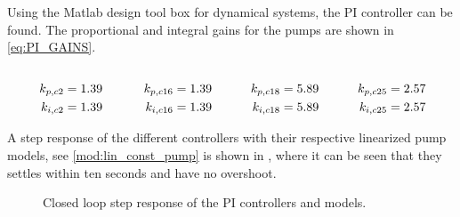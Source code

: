 Using the Matlab design tool box for dynamical systems, the PI controller can be found. The proportional and integral gains for the pumps are shown in \eqref{eq:PI_GAINS}. 

\begin{equation}
  \begin{minipage}[b]{0.25\textwidth}
  \begin{equation*}
  	\begin{split}
  		k_{p,c2} &= 1.39\\
  		k_{i,c2} &= 1.39
  	\end{split}
  \end{equation*}
  \end{minipage}
  \begin{minipage}[b]{0.25\textwidth}
  \begin{equation*}
  	\begin{split}
  		k_{p,c16} &= 1.39\\
  		k_{i,c16} &= 1.39
  	\end{split}
  \end{equation*}

  \end{minipage}
  \begin{minipage}[b]{0.25\textwidth}
  \begin{equation*}
  	\begin{split}
  		k_{p,c18} &= 5.89\\
  		k_{i,c18} &= 5.89
  	\end{split}
  \end{equation*}
  \end{minipage}
  \begin{minipage}[b]{0.25\textwidth}
  \begin{equation*}
  	\begin{split}
  		k_{p,c25} &= 2.57\\
  		k_{i,c25} &= 2.57
  	\end{split}
  \end{equation*}
  \end{minipage}
  \label{eq:PI_GAINS}
\end{equation}

A step response of the different controllers with their respective linearized pump models, see \ref{mod:lin_const_pump} is shown in , where it can be seen that they settles within ten seconds and have no overshoot.

\begin{figure}[H]
\centering

\caption{Closed loop step response of the PI controllers and models.}
\label{fig:Tikz_PI_PUMP_GAIN}
\end{figure}



